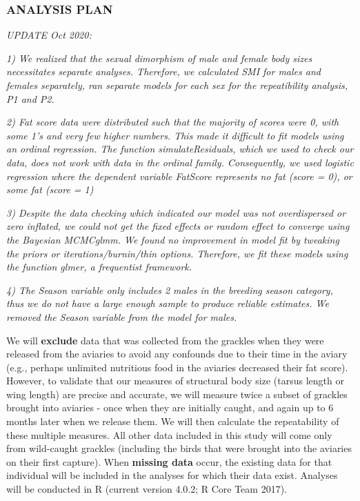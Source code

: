 \documentclass[
]{article}
\begin{document}
\hypertarget{analysis-plan}{%
\subsubsection{ANALYSIS PLAN}\label{analysis-plan}}

\emph{UPDATE Oct 2020:}

\emph{1) We realized that the sexual dimorphism of male and female body
sizes necessitates separate analyses. Therefore, we calculated SMI for
males and females separately, ran separate models for each sex for the
repeatibility analysis, P1 and P2.}

\emph{2) Fat score data were distributed such that the majority of
scores were 0, with some 1's and very few higher numbers. This made it
difficult to fit models using an ordinal regression. The function
simulateResiduals, which we used to check our data, does not work with
data in the ordinal family. Consequently, we used logistic regression
where the dependent variable FatScore represents no fat (score = 0), or
some fat (score = 1)}

\emph{3) Despite the data checking which indicated our model was not
overdispersed or zero inflated, we could not get the fixed effects or
random effect to converge using the Bayesian MCMCglmm. We found no
improvement in model fit by tweaking the priors or
iterations/burnin/thin options. Therefore, we fit these models using the
function glmer, a frequentist framework.}

\emph{4) The Season variable only includes 2 males in the breeding
season category, thus we do not have a large enough sample to produce
reliable estimates. We removed the Season variable from the model for
males.}

We will \textbf{exclude} data that was collected from the grackles when
they were released from the aviaries to avoid any confounds due to their
time in the aviary (e.g., perhaps unlimited nutritious food in the
aviaries decreased their fat score). However, to validate that our
measures of structural body size (tarsus length or wing length) are
precise and accurate, we will measure twice a subset of grackles brought
into aviaries - once when they are initially caught, and again up to 6
months later when we release them. We will then calculate the
repeatability of these multiple measures. All other data included in
this study will come only from wild-caught grackles (including the birds
that were brought into the aviaries on their first capture). When
\textbf{missing data} occur, the existing data for that individual will
be included in the analyses for which their data exist. Analyses will be
conducted in R (current version 4.0.2; R Core Team 2017).
\end{document}
